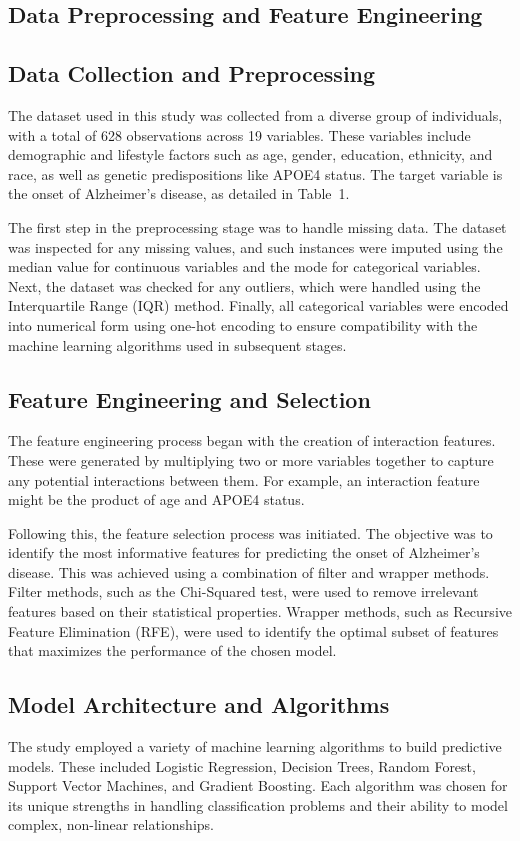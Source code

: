 \documentclass[conference]{IEEEtran}
\begin{document}
\subsection{Data Preprocessing and Feature Engineering}
\subsection{Data Collection and Preprocessing}
The dataset used in this study was collected from a diverse group of individuals, with a total of 628 observations across 19 variables. These variables include demographic and lifestyle factors such as age, gender, education, ethnicity, and race, as well as genetic predispositions like APOE4 status. The target variable is the onset of Alzheimer's disease, as detailed in Table~1.

The first step in the preprocessing stage was to handle missing data. The dataset was inspected for any missing values, and such instances were imputed using the median value for continuous variables and the mode for categorical variables. Next, the dataset was checked for any outliers, which were handled using the Interquartile Range (IQR) method. Finally, all categorical variables were encoded into numerical form using one-hot encoding to ensure compatibility with the machine learning algorithms used in subsequent stages.

\subsection{Feature Engineering and Selection}
The feature engineering process began with the creation of interaction features. These were generated by multiplying two or more variables together to capture any potential interactions between them. For example, an interaction feature might be the product of age and APOE4 status. 

Following this, the feature selection process was initiated. The objective was to identify the most informative features for predicting the onset of Alzheimer's disease. This was achieved using a combination of filter and wrapper methods. Filter methods, such as the Chi-Squared test, were used to remove irrelevant features based on their statistical properties. Wrapper methods, such as Recursive Feature Elimination (RFE), were used to identify the optimal subset of features that maximizes the performance of the chosen model.

\subsection{Model Architecture and Algorithms}
The study employed a variety of machine learning algorithms to build predictive models. These included Logistic Regression, Decision Trees, Random Forest, Support Vector Machines, and Gradient Boosting. Each algorithm was chosen for its unique strengths in handling classification problems and their ability to model complex, non-linear relationships.
\end{document}
